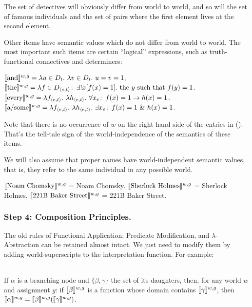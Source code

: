 The set of detectives will obviously differ from world to world, and so will the
set of famous individuals and the set of pairs where the first element lives at
the second element.

Other items have semantic values which do not differ from world to world. The
most important such items are certain ``logical'' expressions, such as
truth-functional connectives and determiners:


\pex
\a $\llbracket \mbox{and} \rrbracket^{w,g} = \lambda u \in D_t.\ \lambda v \in D_t.\ u=v=1
$.
\a $\llbracket \mbox{the} \rrbracket^{w,g} = \lambda f \in D_{\langle e,t \rangle}\colon\thinspace \exists !
x[f(x) = 1]. \mbox{ the } y \mbox{ such that } f(y) = 1$.
\a $\llbracket \mbox{every} \rrbracket^{w,g} = \lambda f_{\langle e,t \rangle}.\ \lambda
h_{\langle e,t \rangle}.\ \forall x_e\colon\thinspace f(x) = 1 \rightarrow h(x) = 1 $.
\a $\llbracket \mbox{a/some} \rrbracket^{w,g} = \lambda f_{\langle e,t \rangle}.\ \lambda
h_{\langle e,t \rangle}.\ \exists x_e\colon\thinspace f(x) = 1\ \&\ h(x) = 1 $.
\xe

Note that there is no occurrence of $w$ on the right-hand side of the entries in
(\lastx). That's the tell-tale sign of the world-independence of the semantics of
these items.

We will also assume that proper names have world-independent semantic values,
that is, they refer to the same individual in any possible world.

\pex
\a $\llbracket \mbox{Noam Chomsky} \rrbracket^{w,g}$ = Noam Chomsky. 
\a $\llbracket \mbox{Sherlock Holmes} \rrbracket^{w,g}$ = Sherlock Holmes. 
\a $\llbracket \mbox{221B Baker Street} \rrbracket^{w,g}$ = 221B Baker Street.
\xe

\subsubsection{Step 4: Composition Principles.} \label{sec:comp-princ}

The old rules of Functional Application, Predicate Modification, and
$\lambda$-Abstraction can be retained almost intact. We just need to modify them
by adding world-superscripts to the interpretation function. For example:

\ex {}\\
If $\alpha$ is a branching node and $\{\beta, \gamma\}$ the set of its
daughters, then, for any world $w$ and assignment $g$: if
$\llbracket \beta \rrbracket^{w,g}$ is a function whose domain contains
$\llbracket \gamma \rrbracket^{w,g}$, then
$\llbracket \alpha \rrbracket^{w,g} = \llbracket \beta \rrbracket^{w,g} (\llbracket \gamma \rrbracket^{w,g})$.
\xe

